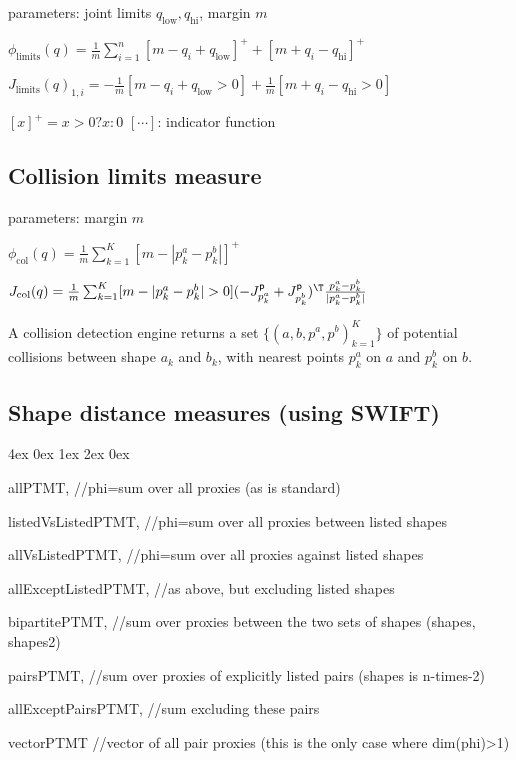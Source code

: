 \documentclass[10pt,fleqn,twoside]{article}
\newenvironment{items}{
\par\small
\begin{list}{--}{\leftmargin4ex \rightmargin0ex \labelsep1ex \labelwidth2ex
\topsep0pt \parsep0ex \itemsep3pt}
}{
\end{list}
}
\newcommand{\pos}{{\textsf{p}}}
\begin{document}
parameters: joint limits $q_{\text{low}}, q_{\text{hi}}$, margin $m$

$\phi_{\text{limits}}(q) = \frac{1}{m}\sum_{i=1}^n [m-q_i+q_{\text{low}}]^+ + [m+q_i-q_{\text{hi}}]^+$

$J_{\text{limits}}(q)_{1,i} = - \frac{1}{m}[m-q_i+q_{\text{low}}>0] + \frac{1}{m}[m+q_i-q_{\text{hi}}>0]$

$[x]^+ = x>0\text{?}x:0$ \qquad $[\cdots]$: indicator function


\subsection{Collision limits measure}

parameters: margin $m$

$\phi_{\text{col}}(q) = \frac{1}{m}\sum_{k=1}^K [m-|p^a_k - p^b_k|]^+$

$J_{\text{col}}(q) = \frac{1}{m} \sum_{k=1}^K [m-|p^a_k - p^b_k|>0]
(- J^\pos_{p^a_k} + J^\pos_{p^b_k})^\T \frac{p^a_k - p^b_k}{|p^a_k - p^b_k|}$ 

A collision detection engine returns a set $\{
(a,b,p^a,p^b)_{k=1}^K \}$ of potential collisions between shape $a_k$
and $b_k$, with nearest points $p^a_k$ on $a$ and $p^b_k$ on $b$.


\subsection{Shape distance measures (using SWIFT)}

\begin{items}
\item  allPTMT, //phi=sum over all proxies (as is standard)
\item  listedVsListedPTMT, //phi=sum over all proxies between listed shapes
\item  allVsListedPTMT, //phi=sum over all proxies against listed shapes
\item  allExceptListedPTMT, //as above, but excluding listed shapes
\item  bipartitePTMT, //sum over proxies between the two sets of shapes (shapes, shapes2)
\item  pairsPTMT, //sum over proxies of explicitly listed pairs (shapes is n-times-2)
\item  allExceptPairsPTMT, //sum excluding these pairs
\item  vectorPTMT //vector of all pair proxies (this is the only case
  where dim(phi)>1)
\end{items}
\end{document}
